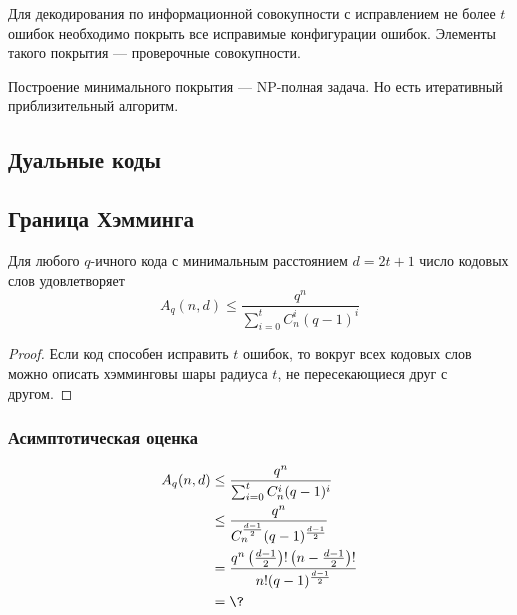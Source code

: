 Для декодирования по информационной совокупности с исправлением не более \(t\) ошибок необходимо покрыть все исправимые конфигурации ошибок.
Элементы такого покрытия --- проверочные совокупности.

\begin{example}
    \unfinished
\end{example}

Построение минимального покрытия --- NP-полная задача.
Но есть итеративный приблизительный алгоритм.

\subsection{Дуальные коды}

\unfinished

\subsection{Граница Хэмминга}

\begin{theorem}
    Для любого \(q\)-ичного кода с минимальным расстоянием \(d = 2t + 1\) число кодовых слов удовлетворяет
    \[A_q(n, d) \leq \frac{q^n}{\sum_{i=0}^{t} C_n^i (q - 1)^i}\]
\end{theorem}
\begin{proof}
    Если код способен исправить \(t\) ошибок, то вокруг всех кодовых слов можно
    описать хэмминговы шары радиуса \(t\), не пересекающиеся друг с другом.
\end{proof}

\subsubsection{Асимптотическая оценка}

\begin{align*}
    A_q(n, d)
     & \leq \frac{q^n}{\sum_{i=0}^{t} C_n^i (q - 1)^i}                                                           \\
     & \leq \frac{q^n}{C_n^{\frac{d - 1}{2}} (q - 1)^{\frac{d - 1}{2}}}                                          \\
     & = \frac{q^n \left(\frac{d - 1}{2}\right)!\left(n - \frac{d - 1}{2}\right)!}{n! (q - 1)^{\frac{d - 1}{2}}} \\
     & = \?                                                                                                      \\
\end{align*}

